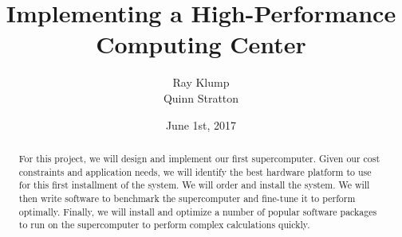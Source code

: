 \documentclass{article}
\title{Implementing a High-Performance Computing Center}
\author{Ray Klump\\Quinn Stratton}
\date{June 1st, 2017}
\begin{document}
\maketitle
\begin{abstract}
For this project, we will design and implement our first supercomputer. Given our cost constraints and application needs, we will identify the best hardware platform to use for this first installment of the system. We will order and install the system. We will then write software to benchmark the supercomputer and fine-tune it to perform optimally. Finally, we will install and optimize a number of popular software packages to run on the supercomputer to perform complex calculations quickly.
\end{abstract}
\end{document}
